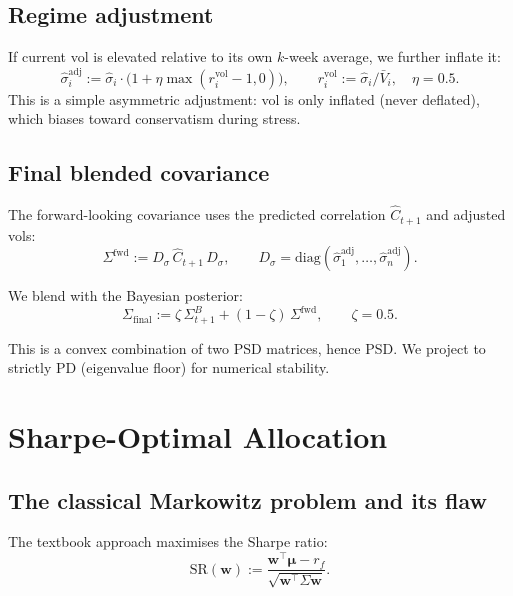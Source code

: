 \documentclass[11pt]{article}
\newcommand{\diag}{\mathrm{diag}}
\newcommand{\bw}{\bm{w}}
\newcommand{\bmu}{\bm{\mu}}
\begin{document}
\subsection{Regime adjustment}

If current vol is elevated relative to its own $k$-week average,
we further inflate it:
\begin{equation}\label{eq:regime}
\hat\sigma_i^{\mathrm{adj}} := \hat\sigma_i\cdot\big(1+\eta\max(r_i^{\mathrm{vol}}-1,0)\big),
\qquad r_i^{\mathrm{vol}}:=\hat\sigma_i/\bar V_i,\quad \eta=0.5.
\end{equation}
This is a simple asymmetric adjustment: vol is only inflated (never deflated),
which biases toward conservatism during stress.

\subsection{Final blended covariance}

The forward-looking covariance uses the predicted correlation
$\hat C_{t+1}$ and adjusted vols:
\begin{equation}
\Sigma^{\mathrm{fwd}} := D_\sigma\,\hat C_{t+1}\,D_\sigma,
\qquad D_\sigma=\diag(\hat\sigma_1^{\mathrm{adj}},\dots,\hat\sigma_n^{\mathrm{adj}}).
\end{equation}

We blend with the Bayesian posterior:
\begin{equation}\label{eq:Sigma_final}
\boxed{\Sigma_{\mathrm{final}} := \zeta\,\Sigma_{t+1}^B + (1-\zeta)\,\Sigma^{\mathrm{fwd}},
\qquad \zeta=0.5.}
\end{equation}

This is a convex combination of two PSD matrices, hence PSD.
We project to strictly PD (eigenvalue floor) for numerical stability.

\section{Sharpe-Optimal Allocation}\label{sec:sharpe}

\subsection{The classical Markowitz problem and its flaw}

The textbook approach maximises the Sharpe ratio:
\begin{equation}\label{eq:SR}
\mathrm{SR}(\bw) := \frac{\bw^\top\bmu-r_f}{\sqrt{\bw^\top\Sigma\bw}}.
\end{equation}
\end{document}
